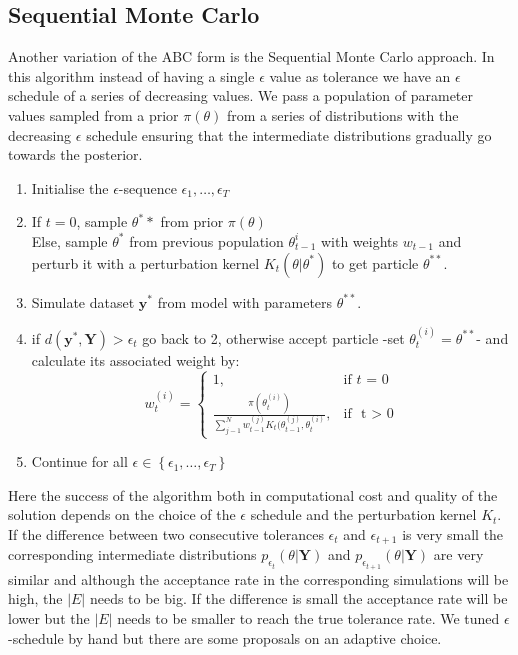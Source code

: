 \documentclass[12pt,a4paper,titlepage]{article}
\begin{document}
\subsection{Sequential Monte Carlo}
Another variation of the ABC form is the Sequential Monte Carlo approach\cite{toni2009abc}. In this algorithm instead of having a single $\epsilon$ value as tolerance we have an $\epsilon$ schedule of a series of decreasing values. We pass a population of parameter values sampled from a prior $\pi(\theta)$  from a series of distributions with the decreasing $\epsilon$ schedule ensuring that the intermediate distributions gradually go towards the posterior.
\begin{enumerate}[noitemsep]
\item{Initialise the $\epsilon$-sequence $\epsilon_{1}, \dots, \epsilon_{T}$}
\item{If $t=0$, sample $\theta^**$ from prior $\pi(\theta)$\\
Else, sample $\theta^*$ from previous population $\theta_{t-1}^{i}$ with weights $w_{t-1}$ and perturb it with a perturbation kernel $K_{t}(\theta|\theta^*) $ to get particle $\theta^{**}$.}
\item{Simulate dataset $\mathbf{y}^*$ from model with parameters $\theta^{**}$.}
\item{if $d(\mathbf{y}^*, \mathbf{Y}) > \epsilon_{t}$ go back to 2, otherwise accept particle -set $\theta_{t}^{(i)} = \theta^{**}$- and calculate its associated weight by:
\begin{equation*}
w_{t}^{(i)} = \begin{cases} 1, & \mbox{if } t\mbox{ = 0} \\ \frac{\pi(\theta_{t}^{(i)})}{\sum_{j-1}^N w_{t-1}^{(j)}K_{t}(\theta_{t-1}^{(j)}, \theta_{t}^{(i)}} , & \mbox{if } \mbox{ t > 0} \end{cases}
\end{equation*} }
\item{Continue for all $\epsilon \in \left\{{\epsilon_{1}, \dots, \epsilon_{T}}\right\}$}
\end{enumerate}
Here the success of the algorithm both in computational cost and quality of the solution depends on the choice of the $\epsilon$ schedule and the perturbation kernel $K_{t}$. If the difference between two consecutive tolerances $\epsilon_{t}$ and $\epsilon_{t+1}$ is very small the corresponding intermediate distributions $p_{\epsilon_{t}}(\theta | \mathbf{Y}) $ and  $p_{\epsilon_{t+1}}(\theta | \mathbf{Y}) $ are very similar and although the acceptance rate in the corresponding simulations will be high, the $\left|{E}\right|$ needs to be big. If the difference is small the acceptance rate will be lower but the $\left|{E}\right|$ needs to be smaller to reach the true tolerance rate\cite{filippi2011optimal}. We tuned $\epsilon$-schedule by hand but there are some proposals on an adaptive choice\cite{del2012adaptive}.
\end{document}
